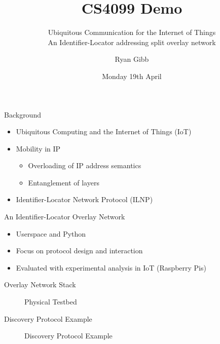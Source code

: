 \documentclass[handout]{beamer}
\title{CS4099 Demo}
\subtitle{Ubiquitous Communication for the Internet of Things\\An Identifier-Locator addressing split overlay network}
\author{Ryan Gibb}
\institute{School of Computer Science\\University of St Andrews}
\date{Monday 19th April}
\begin{document}
\begin{frame}
	\maketitle
\end{frame}

\begin{frame}{Background}
    \begin{itemize}    
        \item Ubiquitous Computing and the Internet of Things (IoT)
        \pause
        \item Mobility in IP
        \pause
        \begin{itemize}
            \item Overloading of IP address semantics
            \item Entanglement of layers
        \end{itemize}
        \pause
        \item Identifier-Locator Network Protocol (ILNP)
    \end{itemize}
\end{frame}

\begin{frame}{An Identifier-Locator Overlay Network}
    \begin{itemize}
        \item Userspace and Python
        \pause
        \item Focus on protocol design and interaction
        \pause
        \item Evaluated with experimental analysis in IoT (Raspberry Pis)
    \end{itemize}
\end{frame}

\begin{frame}{Overlay Network Stack}
    \begin{figure}[ht]
        \centering
        \scalebox{0.35}{}
        \caption{Physical Testbed}
        \label{fig:physical_testbed}
    \end{figure}
\end{frame}

\begin{frame}{Discovery Protocol Example}
\begin{figure}[ht]
    \centering
    \caption{Discovery Protocol Example}
    \label{fig:discovery}
\end{figure}
\end{frame}
\end{document}
